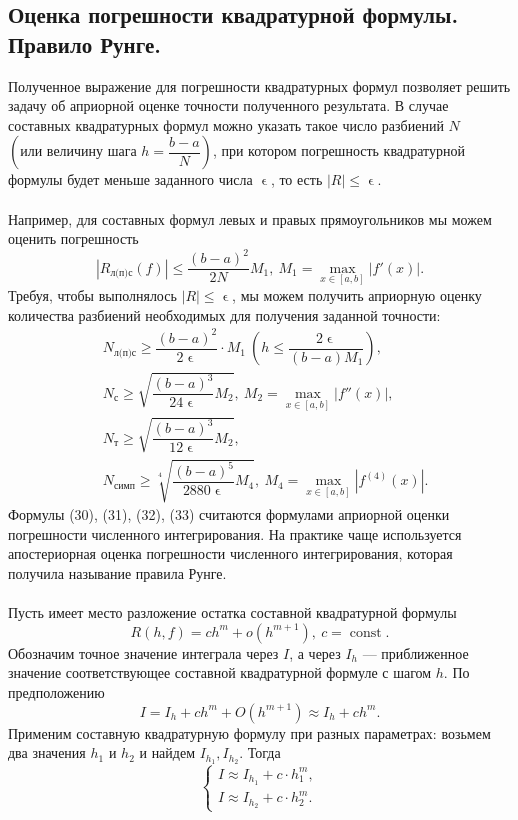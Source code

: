 \documentclass[a4paper, 12pt]{report}
\numberwithin{equation}{section}
\renewcommand{\leq}{\leqslant}
\renewcommand{\geq}{\geqslant}
\renewcommand{\varepsilon}{\upvarepsilon}
\begin{document}
	 \subsection{Оценка погрешности квадратурной формулы. Правило Рунге.}
	 Полученное выражение для погрешности квадратурных формул позволяет решить задачу об априорной оценке точности полученного результата. В случае составных квадратурных формул можно указать такое число разбиений $N$ $\left(\text{или величину шага } h = \dfrac{b-a}{N}\right)$, при котором погрешность квадратурной формулы будет меньше заданного числа $\varepsilon$, то есть $|R|\leq \varepsilon$.\\\\
	 Например, для составных формул левых и правых прямоугольников мы можем оценить погрешность $$|R_\text{л(п)с}(f)|\leq \dfrac{(b-a)^2}{2N}M_1,\ M_1 = \underset{x\in[a,b]}{\max}|f'(x)|.$$
	 Требуя, чтобы выполнялось $|R|\leq \varepsilon$, мы можем получить априорную оценку количества разбиений необходимых для получения заданной точности:
	 \begin{eqnarray}
	 	&N_\text{л(п)с}\geq \dfrac{(b-a)^2}{2\varepsilon}\cdot M_1\ \left(h\leq \dfrac{2\varepsilon}{(b-a)M_1}\right),\\
	 	&N_\text{с} \geq \sqrt{\dfrac{(b-a)^3}{24\varepsilon}M_2},\ M_2 = \underset{x\in[a,b]}{\max}|f''(x)|,\\
	 	&N_\text{т} \geq \sqrt{\dfrac{(b-a)^3}{12\varepsilon}M_2},\\
	 	&N_\text{симп} \geq \sqrt[4]{\dfrac{(b-a)^5}{2880\varepsilon}M_4},\ M_4 = \underset{x\in[a,b]}{\max}|f^{(4)}(x)|.
	 \end{eqnarray}
	 Формулы (30), (31), (32), (33) считаются формулами априорной оценки погрешности численного интегрирования.
	 На практике чаще используется апостериорная оценка погрешности численного интегрирования, которая получила называние правила Рунге.\\\\
	 Пусть имеет место разложение остатка составной квадратурной формулы $$R(h,f) = c h^m + o(h^{m+1}),\ c = \operatorname{const}.$$
	 Обозначим точное значение интеграла через $I$, а через $I_h$ --- приближенное значение соответствующее составной квадратурной формуле с шагом $h$. По предположению $$I = I_h + ch^m + O(h^{m+1})\approx I_h + ch^m.$$
	 Применим составную квадратурную формулу при разных параметрах: возьмем два значения $h_1$ и $h_2$ и найдем $I_{h_1}, I_{h_2}$. Тогда $$\begin{cases}
	 	I\approx I_{h_1} + c\cdot h_1^m,\\
	 	I\approx I_{h_2} + c\cdot h_2^m.
	 \end{cases}$$
\end{document}
